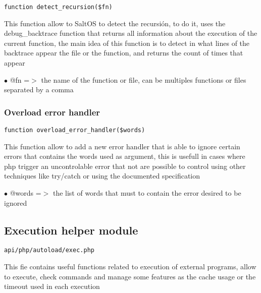 \documentclass[a4paper]{article}
\begin{document}
\begin{lstlisting}
function detect_recursion($fn)
\end{lstlisting}

This function allow to SaltOS to detect the recursión, to do it, uses the debug\_backtrace
function that returns all information about the execution of the current function, the
main idea of this function is to detect in what lines of the backtrace appear the file
or the function, and returns the count of times that appear

\begin{compactitem}
\item[\color{myblue}$\bullet$] @fn =$>$ the name of the function or file, can be multiples functions or files separated
       by a comma
\end{compactitem}

\hypertarget{toc121}{}
\subsubsection{Overload error handler}

\begin{lstlisting}
function overload_error_handler($words)
\end{lstlisting}

This function allow to add a new error handler that is able to ignore certain errors
that contains the words used as argument, this is usefull in cases where php trigger
an uncontrolable error that not are possible to control using other techniques like
try/catch or using the documented specification

\begin{compactitem}
\item[\color{myblue}$\bullet$] @words =$>$ the list of words that must to contain the error desired to be ignored
\end{compactitem}

\hypertarget{toc122}{}
\subsection{Execution helper module}

\begin{lstlisting}
api/php/autoload/exec.php
\end{lstlisting}

This fie contains useful functions related to execution of external programs, allow to execute,
check commands and manage some features as the cache usage or the timeout used in each execution
\end{document}
